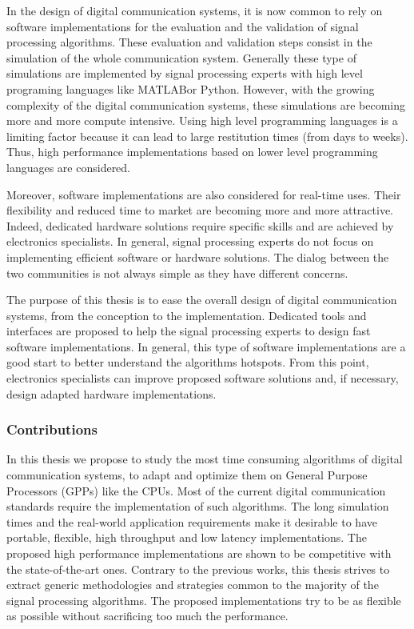 In the design of digital communication systems, it is now common to rely on
software implementations for the evaluation and the validation of signal
processing algorithms. These evaluation and validation steps consist in
the simulation of the whole communication system. Generally these type of
simulations are implemented by signal processing experts with high level
programing languages like MATLAB\R or Python. However, with the growing
complexity of the digital communication systems, these simulations are becoming
more and more compute intensive. Using high level programming languages is a
limiting factor because it can lead to large restitution times (from days to
weeks). Thus, high performance implementations based on lower level programming
languages are considered.

Moreover, software implementations are also considered for real-time uses. Their
flexibility and reduced time to market are becoming more and more attractive.
Indeed, dedicated hardware solutions require specific skills and are achieved by
electronics specialists. In general, signal processing experts do not focus on
implementing efficient software or hardware solutions. The dialog between the
two communities is not always simple as they have different concerns.

The purpose of this thesis is to ease the overall design of digital
communication systems, from the conception to the implementation. Dedicated
tools and interfaces are proposed to help the signal processing experts to
design fast software implementations. In general, this type of software
implementations are a good start to better understand the algorithms hotspots.
From this point, electronics specialists can improve proposed software solutions
and, if necessary, design adapted hardware implementations.

\subsubsection*{Contributions}

In this thesis we propose to study the most time consuming algorithms of digital
communication systems, to adapt and optimize them on General Purpose Processors
(GPPs) like the CPUs. Most of the current digital communication standards
require the implementation of such algorithms. The long simulation times and the
real-world application requirements make it desirable to have portable,
flexible, high throughput and low latency implementations. The proposed high
performance implementations are shown to be competitive with the
state-of-the-art ones. Contrary to the previous works, this thesis strives to
extract generic methodologies and strategies common to the majority of the
signal processing algorithms. The proposed implementations try to be as flexible
as possible without sacrificing too much the performance.

